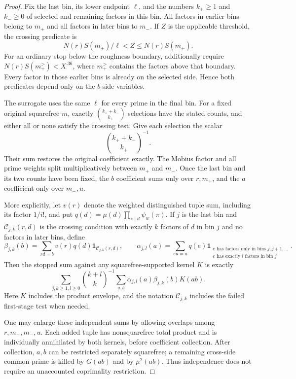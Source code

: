 \begin{proof}
Fix the last bin, its lower endpoint $\ell$, and the numbers $k_+\ge1$
and $k_-\ge0$ of selected and remaining factors in this bin.
All factors in earlier bins belong to $m_+$ and all factors in later
bins to $m_-$.  If $Z$ is the applicable threshold, the crossing
predicate is
\begin{equation}\label{eq:crossing-predicate}
 N(r)S(m_+)/\ell<Z\le N(r)S(m_+).
\end{equation}
For an ordinary stop below the roughness boundary, additionally require
$N(r)S(m_+^{>})<X^{.36}$, where $m_+^{>}$ contains the factors above
that boundary.  Every factor in those earlier bins is already on
the selected side.  Hence both predicates depend only on the
$b$-side variables.

The surrogate uses the same $\ell$ for every prime in the final bin.
For a fixed original squarefree $m$, exactly
$\binom{k_++k_-}{k_+}$ selections have the stated counts, and either
all or none satisfy the crossing test.  Give each selection the scalar
\begin{equation}\label{eq:stopping-scalar}
 \binom{k_++k_-}{k_+}^{-1}.
\end{equation}
Their sum restores the original coefficient exactly.  The Mobius
factor and all prime weights split multiplicatively between $m_+$
and $m_-$.  Once the last bin and its two counts have been fixed,
the $b$ coefficient sums only over $r,m_+$, and the $a$ coefficient
only over $m_-,u$.

More explicitly, let $v(r)$ denote the weighted distinguished tuple
sum, including its factor $1/i!$, and put
$q(d)=\mu(d)\prod_{\pi\mid d}\psi_w(\pi)$.
If $j$ is the last bin and $\mathcal C_{j,k}(r,d)$ is the crossing
condition with exactly $k$ factors of $d$ in bin $j$ and no factors
in later bins, define
\[
 \beta_{j,k}(b)=\sum_{rd=b}v(r)q(d)
                    \boldsymbol1_{\mathcal C_{j,k}(r,d)},
 \qquad
 \alpha_{j,l}(a)=\sum_{eu=a}q(e)
   \boldsymbol1_{\substack{e\text{ has factors only in bins }j,j+1,\ldots\\
                           e\text{ has exactly }l\text{ factors in bin }j}}.
\]
Then the stopped sum against any squarefree-supported kernel $K$ is
exactly
\[
 \sum_{j,k\ge1,l\ge0}\binom{k+l}{k}^{-1}
       \sum_{a,b}\alpha_{j,l}(a)\beta_{j,k}(b)K(ab).
\]
Here $K$ includes the product envelope, and the notation
$\mathcal C_{j,k}$ includes the failed first-stage test when needed.

One may enlarge these independent sums by allowing overlaps among
$r,m_+,m_-,u$.  Each added tuple has nonsquarefree total product and
is individually annihilated by both kernels, before coefficient
collection.  After collection, $a,b$ can be restricted separately
squarefree; a remaining cross-side common prime is killed by
$G(ab)$ and by $\mu^2(ab)$.  Thus independence does not require an
unaccounted coprimality restriction.


\end{proof}
